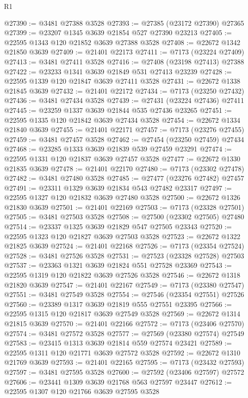 \begin{lexlean}{R1}
\begin{coremodule}
@27390 := @3481 @27388 @3528
@27393 := @27385 (@23172 @27390) @27365
@27399 := @23207 @1345 @3639 @21854 @527 @27390 @23213
@27405 := @22595 @1343 @120 @21852 @3639 @27388 @3528
@27408 := @22672 @1342 @21850 @3639
@27409 := @21401 @22173
@27411 := @7173 (@23224 @27409)
@27413 := @3481 @27411 @3528
@27416 := @27408 (@23198 @27413) @27388
@27422 := @23233 @1341 @3639 @21849 @531 @27413 @23239
@27428 := @22595 @1339 @120 @21847 @3639 @27411 @3528
@27431 := @22672 @1338 @21845 @3639
@27432 := @21401 @22172
@27434 := @7173 (@23250 @27432)
@27436 := @3481 @27434 @3528
@27439 := @27431 (@23224 @27436) @27411
@27445 := @23259 @1337 @3639 @21844 @535 @27436 @23265
@27451 := @22595 @1335 @120 @21842 @3639 @27434 @3528
@27454 := @22672 @1334 @21840 @3639
@27455 := @21401 @22171
@27457 := @7173 (@23276 @27455)
@27459 := @3481 @27457 @3528
@27462 := @27454 (@23250 @27459) @27434
@27468 := @23285 @1333 @3639 @21839 @539 @27459 @23291
@27474 := @22595 @1331 @120 @21837 @3639 @27457 @3528
@27477 := @22672 @1330 @21835 @3639
@27478 := @21401 @22170
@27480 := @7173 (@23302 @27478)
@27482 := @3481 @27480 @3528
@27485 := @27477 (@23276 @27482) @27457
@27491 := @23311 @1329 @3639 @21834 @543 @27482 @23317
@27497 := @22595 @1327 @120 @21832 @3639 @27480 @3528
@27500 := @22672 @1326 @21830 @3639
@27501 := @21401 @22169
@27503 := @7173 (@23328 @27501)
@27505 := @3481 @27503 @3528
@27508 := @27500 (@23302 @27505) @27480
@27514 := @23337 @1325 @3639 @21829 @547 @27505 @23343
@27520 := @22595 @1323 @120 @21827 @3639 @27503 @3528
@27523 := @22672 @1322 @21825 @3639
@27524 := @21401 @22168
@27526 := @7173 (@23354 @27524)
@27528 := @3481 @27526 @3528
@27531 := @27523 (@23328 @27528) @27503
@27537 := @23363 @1321 @3639 @21824 @551 @27528 @23369
@27543 := @22595 @1319 @120 @21822 @3639 @27526 @3528
@27546 := @22672 @1318 @21820 @3639
@27547 := @21401 @22167
@27549 := @7173 (@23380 @27547)
@27551 := @3481 @27549 @3528
@27554 := @27546 (@23354 @27551) @27526
@27560 := @23389 @1317 @3639 @21819 @555 @27551 @23395
@27566 := @22595 @1315 @120 @21817 @3639 @27549 @3528
@27569 := @22672 @1314 @21815 @3639
@27570 := @21401 @22166
@27572 := @7173 (@23406 @27570)
@27574 := @3481 @27572 @3528
@27577 := @27569 (@23380 @27574) @27549
@27583 := @23415 @1313 @3639 @21814 @559 @27574 @23421
@27589 := @22595 @1311 @120 @21771 @3639 @27572 @3528
@27592 := @22672 @1310 @21769 @3639
@27593 := @21401 @22165
@27595 := @7173 (@23432 @27593)
@27597 := @3481 @27595 @3528
@27600 := @27592 (@23406 @27597) @27572
@27606 := @23441 @1309 @3639 @21768 @563 @27597 @23447
@27612 := @22595 @1307 @120 @21766 @3639 @27595 @3528

\end{coremodule}
\end{lexlean}
